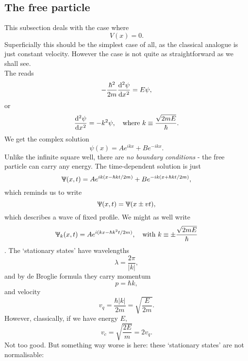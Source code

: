 \subsection{The free particle}
\label{freepart}
This subsection deals with the case where
\begin{equation}
V(x)=0.
\end{equation}
Superficially this should be the simplest case of all, as the classical analogue is just constant velocity. However the case is not quite as straightforward as we shall see. \\
The \sch reads
\begin{equation}
-\frac{\hbar^2}{2m}\diff[2]{\psi}{x}=E\psi, 
\end{equation}
or
\begin{equation}
\diff[2]{\psi}{x}=-k^2\psi,\ \ \ \text{where }k\equiv\frac{\sqrt{2mE}}{\hbar}.
\end{equation}
We get the complex solution
\begin{equation}
\psi(x)=Ae^{ikx}+Be^{-ikx}.
\end{equation}
Unlike the infinite square well, there are \textit{no boundary conditions} - the free particle can carry any energy. The time-dependent solution is just
\begin{equation}
\Uppsi(x,t)=Ae^{ik(x-\hbar kt/2m)}+Be^{-ik(x+\hbar kt/2m)}, 
\end{equation}
which reminds us to write
\begin{equation}
\Uppsi(x,t)=\Uppsi(x\pm vt), 
\end{equation}
which describes a wave of fixed profile. We might as well write
\begin{equation}
\ups_k(x,t)=Ae^{i(kx-\hbar k^2t/2m)},\ \ \ \text{with }k\equiv\pm\frac{\sqrt{2mE}}{\hbar}
\end{equation}.
The `stationary states' have wavelengths
\begin{equation}
\lambda=\frac{2\pi}{|k|},
\end{equation}
and by de Broglie formula they carry momentum
\begin{equation}
p=\hbar k, 
\end{equation}
and velocity
\begin{equation}
v_q=\frac{\hbar |k|}{2m}=\sqrt{\frac{E}{2m}}.
\end{equation}
However, classically, if we have energy $E$,
\begin{equation}
v_c=\sqrt{\frac{2E}{m}}=2v_q.
\end{equation}
Not too good. But something way worse is here: these `stationary states' are not normalisable:
